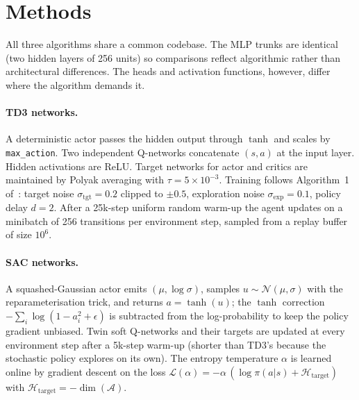 \documentclass[letterpaper]{article}
\begin{document}
\section{Methods}

All three algorithms share a common codebase. The MLP trunks are identical
(two hidden layers of 256 units) so comparisons reflect algorithmic rather
than architectural differences. The heads and activation functions,
however, differ where the algorithm demands it.

\paragraph{TD3 networks.}
A deterministic actor passes the hidden output through $\tanh$ and scales by
\texttt{max\_action}. Two independent Q-networks concatenate $(s,a)$ at the
input layer. Hidden activations are ReLU. Target networks for actor and
critics are maintained by Polyak averaging with $\tau = 5\!\times\!10^{-3}$.
Training follows Algorithm~1 of~\citet{fujimoto2018td3}: target noise
$\sigma_{\text{tgt}} = 0.2$ clipped to $\pm 0.5$, exploration noise
$\sigma_{\text{exp}} = 0.1$, policy delay $d=2$. After a 25k-step uniform
random warm-up the agent updates on a minibatch of 256 transitions per
environment step, sampled from a replay buffer of size $10^{6}$.

\paragraph{SAC networks.}
A squashed-Gaussian actor emits $(\mu, \log\sigma)$, samples
$u \sim \mathcal{N}(\mu,\sigma)$ with the reparameterisation trick, and
returns $a = \tanh(u)$; the $\tanh$ correction $-\sum_i \log(1 - a_i^2 +
\epsilon)$ is subtracted from the log-probability to keep the policy
gradient unbiased. Twin soft Q-networks and their targets are updated at
every environment step after a 5k-step warm-up (shorter than TD3's because
the stochastic policy explores on its own). The entropy temperature $\alpha$
is learned online by gradient descent on the loss
$\mathcal{L}(\alpha) = -\alpha\,(\log \pi(a|s) + \mathcal{H}_{\text{target}})$
with $\mathcal{H}_{\text{target}} = -\dim(\mathcal{A})$.
\end{document}
